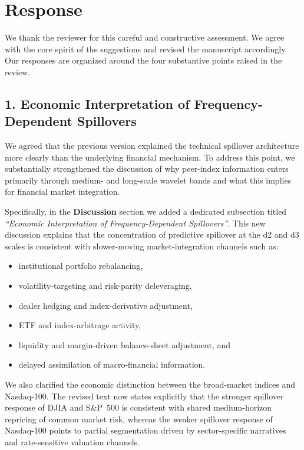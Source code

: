 \documentclass[11pt,a4paper]{article}
\begin{document}
\section*{Response}

We thank the reviewer for this careful and constructive assessment. We agree with the core spirit of the suggestions and revised the manuscript accordingly. Our responses are organized around the four substantive points raised in the review.

\subsection*{1. Economic Interpretation of Frequency-Dependent Spillovers}

We agreed that the previous version explained the technical spillover architecture more clearly than the underlying financial mechanism. To address this point, we substantially strengthened the discussion of why peer-index information enters primarily through medium- and long-scale wavelet bands and what this implies for financial market integration.

Specifically, in the \textbf{Discussion} section we added a dedicated subsection titled \emph{``Economic Interpretation of Frequency-Dependent Spillovers''}. This new discussion explains that the concentration of predictive spillover at the d2 and d3 scales is consistent with slower-moving market-integration channels such as:
\begin{itemize}[leftmargin=1.5em]
\item institutional portfolio rebalancing,
\item volatility-targeting and risk-parity deleveraging,
\item dealer hedging and index-derivative adjustment,
\item ETF and index-arbitrage activity,
\item liquidity and margin-driven balance-sheet adjustment, and
\item delayed assimilation of macro-financial information.
\end{itemize}

We also clarified the economic distinction between the broad-market indices and Nasdaq-100. The revised text now states explicitly that the stronger spillover response of DJIA and S\&P~500 is consistent with shared medium-horizon repricing of common market risk, whereas the weaker spillover response of Nasdaq-100 points to partial segmentation driven by sector-specific narratives and rate-sensitive valuation channels.
\end{document}
